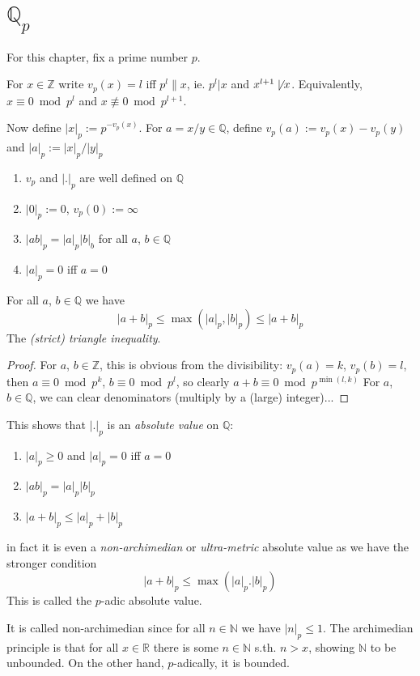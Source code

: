 \chapter{$\mathbb Q_p$}
For this chapter, fix a prime number $p$.
\begin{definition}
  For $x\in\mathbb Z$ write $v_p(x) = l$ iff $p^l\| x$, ie.
  $p^l|x$ and $x^{l+1}\not\mid x$.
  Equivalently, $x\equiv 0\bmod p^l$ and $x\not\equiv 0\bmod p^{l+1}$.

  Now define $|x|_p := p^{-v_p(x)}$. For $a = x/y\in \mathbb Q$, define
  $v_p(a) := v_p(x) - v_p(y)$ and $|a|_p := |x|_p/|y|_p$
\end{definition}
\begin{remark}
  \begin{enumerate}
    \item $v_p$ and $|.|_p$ are well defined on $\mathbb Q$
    \item $|0|_p := 0$, $v_p(0) := \infty$
    \item $|ab|_p = |a|_p |b|_b$ for all $a$, $b\in \mathbb Q$
    \item $|a|_p = 0$ iff $a=0$
  \end{enumerate}
\end{remark}
\begin{lemma}
  For all $a$, $b\in \mathbb Q$ we have
  $$|a+b|_p \le \max(|a|_p, |b|_p) \le |a+b|_p$$
  The {\em (strict) triangle inequality}.
\end{lemma}
\begin{proof}
  For $a$, $b\in \mathbb Z$, this is obvious from the divisibility:
  $v_p(a) = k$, $v_p(b) = l$, then $a\equiv 0 \bmod p^k$, $b\equiv 0 \bmod p^l$, so clearly $a+b \equiv 0 \bmod p^{\min(l, k)}$
  For $a$, $b\in \mathbb Q$, we can clear denominators (multiply by a
  (large) integer)...
\end{proof}
\begin{remark}
  This shows that $|.|_p$ is an {\em absolute value} on $\mathbb Q$:
  \begin{enumerate}
    \item $|a|_p \ge 0$ and $|a|_p = 0$ iff $a=0$
    \item $|ab|_p = |a|_p |b|_p$
    \item $|a+b|_p \le |a|_p + |b|_p$
  \end{enumerate}
  in fact it is even a {\em non-archimedian} or {\em ultra-metric}
  absolute value as we have the stronger condition
  $$|a+b|_p \le \max(|a|_p. |b|_p)$$
  This is called the $p$-adic absolute value.
\end{remark}
It is called non-archimedian since for all $n\in \mathbb N$ we have
$|n|_p \le 1$. The archimedian principle is that for all $x\in\mathbb R$ there
is some $n\in \mathbb N$ s.th. $n>x$, showing $\mathbb N$ to be unbounded.
On the other hand, $p$-adically, it is bounded.

